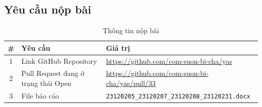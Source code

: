 \subsection{Yêu cầu nộp bài}

\begin{table}[H]
\centering
\caption{Thông tin nộp bài}
\begin{tabular}{|c|p{6cm}|p{7cm}|}
\hline
\textbf{\#} & \textbf{Yêu cầu} & \textbf{Giá trị} \\
\hline
1 & Link GitHub Repository & \url{https://github.com/com-suon-bi-cha/yas} \\
\hline
2 & Pull Request đang ở trạng thái Open & \url{https://github.com/com-suon-bi-cha/yas/pull/33} \\
\hline
3 & File báo cáo & \texttt{23120205\_23120207\_23120208\_23120231.docx} \\
\hline
\end{tabular}
\end{table}
